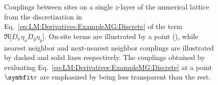 \begin{figure}[h]
\caption{Couplings between sites on a single $z$-layer of the numerical lattice from the discretization in Eq.~\eqref{eq:LM:Derivatives:ExampleMG:Discrete}
of the term $\Re\big[D_x\eta_xD_y\eta_y\big]$. On-site terms are illustrated by a point (\textbullet), while nearest neighbor and next-nearest neighbor couplings are
illustrated by dashed and solid lines respectively. The couplings obtained by evaluating Eq.~\eqref{eq:LM:Derivatives:ExampleMG:Discrete} at a point $\v{r}$ are
emphasized by being less transparent than the rest.}
  \label{fig:LM:Derivatives:nextNearestDiagonalCoupling}
\end{figure}

